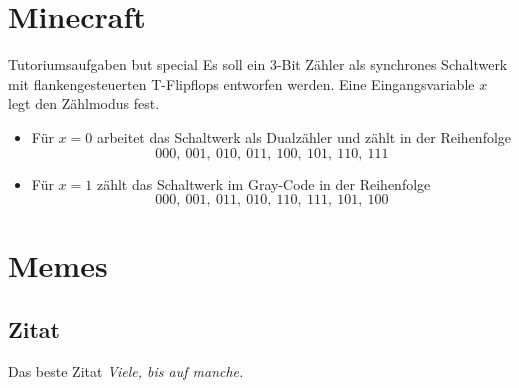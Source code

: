 \documentclass[aspectratio=169,usepdftitle=true,11pt,ngerman,t]{beamer}
\begin{document}
\section{Minecraft}

\begin{frame}{Tutoriumsaufgaben but special}
    Es soll ein 3-Bit Zähler als synchrones Schaltwerk mit flankengesteuerten T-Flipflops entworfen werden. Eine Eingangsvariable \(x\) legt den Zählmodus fest.
	\begin{itemize}
		\item  Für \(x = 0\) arbeitet das Schaltwerk als Dualzähler und zählt in der Reihenfolge \[000,~ 001,~ 010,~ 011,~ 100,~101,~110,~111 \]
		\item Für \(x = 1\) zählt das Schaltwerk im Gray-Code in der Reihenfolge \[000,~001,~ 011,~ 010,~ 110,~111,~101,~100\]
	\end{itemize}
\end{frame}

\section[\cb{X8}\cb{Vo}\cb{X8}\cb{Vo}\cb{X8}\cb{Vo}\cb{X8}~~~Trommelwirbel~~~\cb{X8}\cb{Vo}\cb{X8}\cb{Vo}\cb{X8}\cb{Vo}\cb{X8}]{Memes}

\subsection{Zitat}
\begin{frame}{Das beste Zitat}\onslide<+->\onslide<+->
    \centering\vfill\vfill\itshape
    Viele, bis auf manche.
    \vfill\vfill
    \onslide<+->
    \onslide<+->
\end{frame}
\end{document}
